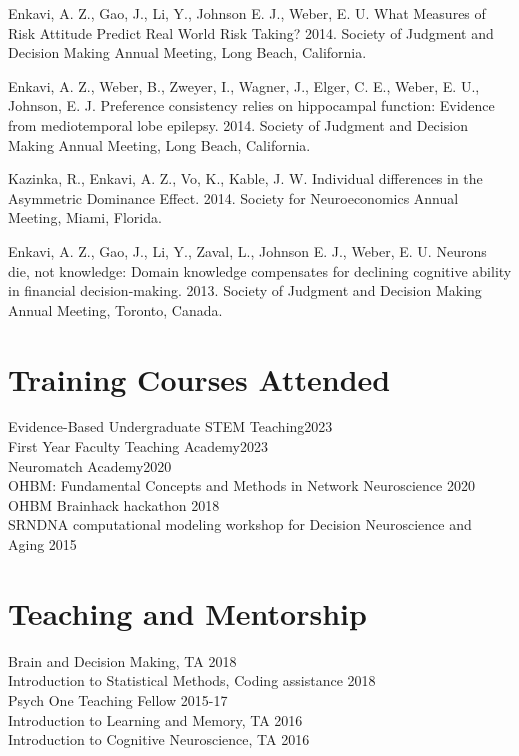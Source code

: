 \documentclass[11pt,]{article}
\begin{document}
Enkavi, A. Z., Gao, J., Li, Y., Johnson E. J., Weber, E. U. What
Measures of Risk Attitude Predict Real World Risk Taking? 2014. Society
of Judgment and Decision Making Annual Meeting, Long Beach, California.

Enkavi, A. Z., Weber, B., Zweyer, I., Wagner, J., Elger, C. E., Weber,
E. U., Johnson, E. J. Preference consistency relies on hippocampal
function: Evidence from mediotemporal lobe epilepsy. 2014. Society of
Judgment and Decision Making Annual Meeting, Long Beach, California.

Kazinka, R., Enkavi, A. Z., Vo, K., Kable, J. W. Individual differences
in the Asymmetric Dominance Effect. 2014. Society for Neuroeconomics
Annual Meeting, Miami, Florida.

Enkavi, A. Z., Gao, J., Li, Y., Zaval, L., Johnson E. J., Weber, E. U.
Neurons die, not knowledge: Domain knowledge compensates for declining
cognitive ability in financial decision-making. 2013. Society of
Judgment and Decision Making Annual Meeting, Toronto, Canada.

\hypertarget{training-courses-attended}{%
\section{Training Courses Attended}\label{training-courses-attended}}

Evidence-Based Undergraduate STEM Teaching\hfill 2023\\
First Year Faculty Teaching Academy\hfill 2023\\
Neuromatch Academy\hfill 2020\\
OHBM: Fundamental Concepts and Methods in Network Neuroscience
\hfill 2020\\
OHBM Brainhack hackathon \hfill 2018\\
SRNDNA computational modeling workshop for Decision Neuroscience and
Aging \hfill 2015

\hypertarget{teaching-and-mentorship}{%
\section{Teaching and Mentorship}\label{teaching-and-mentorship}}

Brain and Decision Making, TA \hfill 2018\\
Introduction to Statistical Methods, Coding assistance \hfill 2018\\
Psych One Teaching Fellow \hfill 2015-17\\
Introduction to Learning and Memory, TA \hfill 2016\\
Introduction to Cognitive Neuroscience, TA \hfill 2016
\end{document}

